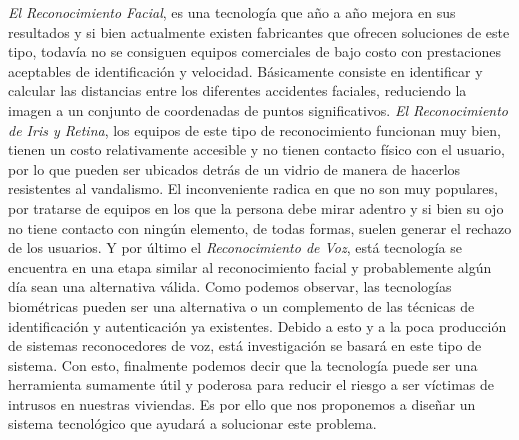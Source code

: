 \vskip 0.5cm
\textit{El Reconocimiento Facial}, es una tecnología que año a año mejora en sus resultados y si bien actualmente existen fabricantes que ofrecen soluciones de este tipo, todavía no se consiguen equipos comerciales de bajo costo con prestaciones aceptables de identificación y velocidad. Básicamente consiste en identificar y calcular las distancias entre los diferentes accidentes faciales, reduciendo la imagen a un conjunto de coordenadas de puntos significativos.
\vskip 0.5cm
\textit{El Reconocimiento de Iris y Retina}, los equipos de este tipo de reconocimiento funcionan muy bien, tienen un costo relativamente accesible y no tienen contacto físico con el usuario, por lo que pueden ser ubicados detrás de un vidrio de manera de hacerlos resistentes al vandalismo. El inconveniente radica en que no son muy populares, por tratarse de equipos en los que la persona debe mirar adentro y si bien su ojo no tiene contacto con ningún elemento, de todas formas, suelen generar el rechazo de los usuarios.
\vskip 0.5cm
Y por último el \textit{Reconocimiento de Voz}, está tecnología se encuentra en una etapa similar al reconocimiento facial y probablemente algún día sean una alternativa válida.
\vskip 0.5cm
Como podemos observar, las tecnologías biométricas pueden ser una alternativa o un complemento de las técnicas de identificación y autenticación ya existentes. Debido a esto y a la poca producción de sistemas reconocedores de voz, está investigación se basará en este tipo de sistema.
\vskip 0.5cm
Con esto, finalmente podemos decir que la tecnología puede ser una herramienta sumamente útil y poderosa para reducir el riesgo a ser víctimas de intrusos en nuestras viviendas. Es por ello que nos proponemos a diseñar un sistema tecnológico que ayudará a solucionar este problema.

